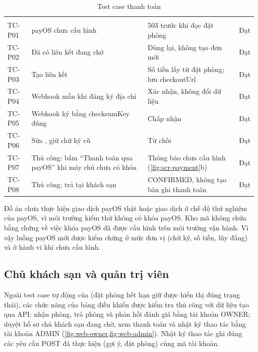 \begin{rtable}
\begin{longtable}{|C{1.4cm}|L{8.0cm}|L{3.6cm}|C{1.6cm}|}
\caption{Test case thanh toán}\label{tab:test-pay}\\
\hline
{} &  &  &  \\ \hline
\endfirsthead
\hline
{} &  &  &  \\ \hline
\endhead
TC-P01 & payOS chưa cấu hình & 503 trước khi đọc đặt phòng & Đạt \\ \hline
TC-P02 & Đã có liên kết đang chờ & Dùng lại, không tạo đơn mới & Đạt \\ \hline
TC-P03 & Tạo liên kết & Số tiền lấy từ đặt phòng; lưu checkoutUrl & Đạt \\ \hline
TC-P04 & Webhook mẫu khi đăng ký địa chỉ & Xác nhận, không đổi dữ liệu & Đạt \\ \hline
TC-P05 & Webhook ký bằng checksumKey đúng & Chấp nhận & Đạt \\ \hline
TC-P06 & Sửa , giữ chữ ký cũ & Từ chối & Đạt \\ \hline
TC-P07 & Thủ công: bấm ``Thanh toán qua payOS'' khi máy chủ chưa có khóa & Thông báo chưa cấu hình (\cref{fig:scr-payment}b) & Đạt \\ \hline
TC-P08 & Thủ công: trả tại khách sạn & CONFIRMED, không tạo bản ghi thanh toán & Đạt \\ \hline
\end{longtable}
\end{rtable}

Đồ án chưa thực hiện giao dịch payOS thật hoặc giao dịch ở chế độ thử nghiệm của payOS, vì môi trường kiểm thử không có khóa payOS. Kho mã không chứa bằng chứng về việc khóa payOS đã được cấu hình trên môi trường vận hành. Vì vậy luồng payOS mới được kiểm chứng ở mức đơn vị (chữ ký, số tiền, lũy đẳng) và ở hành vi khi chưa cấu hình.

\subsection{Chủ khách sạn và quản trị viên}

Ngoài test case tự động của  (đặt phòng hết hạn giữ được hiển thị đúng trạng thái), các chức năng của bảng điều khiển được kiểm tra thủ công với dữ liệu tạo qua API: nhận phòng, trả phòng và phản hồi đánh giá bằng tài khoản OWNER; duyệt hồ sơ chủ khách sạn đang chờ, xem thanh toán và nhật ký thao tác bằng tài khoản ADMIN (\cref{fig:web-owner,fig:web-admin}). Nhật ký thao tác ghi đúng các yêu cầu POST đã thực hiện (gợi ý, đặt phòng) cùng mã tài khoản.

